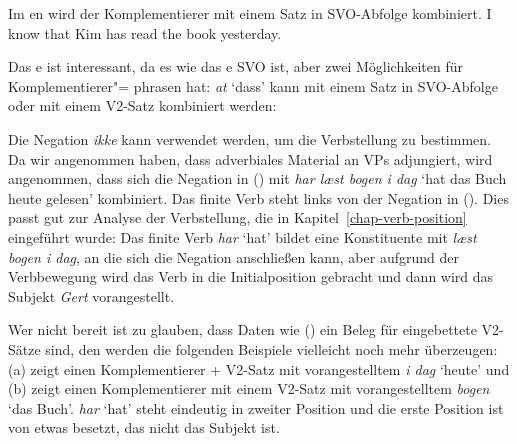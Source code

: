 Im en wird der Komplementierer mit einem Satz in SVO-Abfolge kombiniert.
\ea
I  know that Kim has read the book yesterday.
\z


Das e ist interessant, da es wie das e SVO ist, aber zwei Möglichkeiten für Komplementierer"=
phrasen hat: \emph{at} `dass' kann mit einem Satz in SVO-Abfolge oder mit einem V2-Satz kombiniert werden:
\z

Die Negation \emph{ikke} kann verwendet werden, um die Verbstellung zu bestimmen. Da wir angenommen haben, dass adverbiales
Material an VPs adjungiert, wird angenommen, dass sich die Negation in () mit \emph{har læst bogen i
  dag} `hat das Buch heute gelesen' kombiniert. Das finite Verb steht links von der Negation in (). Dies
passt gut zur Analyse der Verbstellung, die in Kapitel~\ref{chap-verb-position} eingeführt wurde: Das
finite Verb \emph{har} `hat' bildet eine Konstituente mit \emph{læst  bogen i dag}, an die sich die Negation anschließen kann, aber
aufgrund der Verbbewegung wird das Verb in die Initialposition gebracht und dann wird das Subjekt \emph{Gert} vorangestellt.
\z

Wer nicht bereit ist zu glauben, dass Daten wie () ein Beleg für eingebettete V2-Sätze sind, den werden die
folgenden Beispiele vielleicht noch mehr überzeugen:
\eal
{}
\zl
(a) zeigt einen Komplementierer + V2-Satz mit vorangestelltem \emph{i dag} `heute' und (b) zeigt
einen Komplementierer mit einem V2-Satz mit vorangestelltem \emph{bogen} `das Buch'. \emph{har} `hat' steht eindeutig
in zweiter Position und die erste Position ist von etwas besetzt, das nicht das Subjekt ist.

